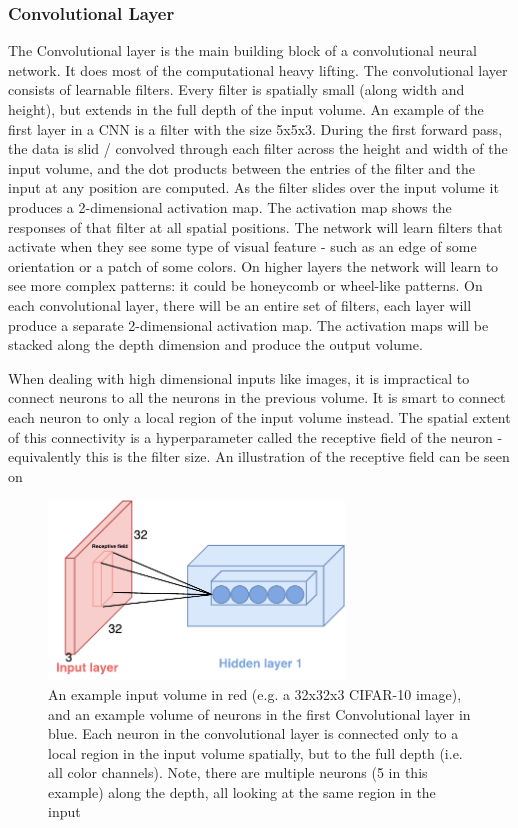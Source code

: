 \subsubsection{Convolutional Layer}
The Convolutional layer is the main building block of a convolutional neural network. It does most of the computational heavy lifting. The convolutional layer consists of learnable filters. Every filter is spatially small (along width and height), but extends in the full depth of the input volume. An example of the first layer in a CNN is a filter with the size 5x5x3. During the first forward pass, the data is slid / convolved through each filter across the height and width of the input volume, and the dot products between the entries of the filter and the input at any position are computed. As the filter slides over the input volume it produces a 2-dimensional activation map. The activation map shows the responses of that filter at all spatial positions. The network will learn filters that activate when they see some type of visual feature - such as an edge of some orientation or a patch of some colors. On higher layers the network will learn to see more complex patterns: it could be honeycomb or wheel-like patterns. On each convolutional layer, there will be an entire set of filters, each layer will produce a separate 2-dimensional activation map. The activation maps will be stacked along the depth dimension and produce the output volume. 

When dealing with high dimensional inputs like images, it is impractical to connect neurons to all the neurons in the previous volume. It is smart to connect each neuron to only a local region of the input volume instead. The spatial extent of this connectivity is a hyperparameter called the receptive field of the neuron - equivalently this is the filter size. An illustration of the receptive field can be seen on 

\begin{figure}[H]
	\centering
	\includegraphics[width=0.7\textwidth]{Figures/Respective_field.pdf}
	\caption{An example input volume in red (e.g. a 32x32x3 CIFAR-10 image), and an example volume of neurons in the first Convolutional layer in blue. Each neuron in the convolutional layer is connected only to a local region in the input volume spatially, but to the full depth (i.e. all color channels). Note, there are multiple neurons (5 in this example) along the depth, all looking at the same region in the input \cite{CNN_course}}
	\label{fig:Respective_field}
\end{figure}

